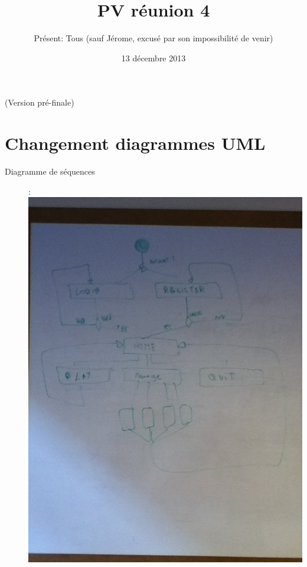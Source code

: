 \documentclass[a4paper,10pt]{article}
\author{Présent: Tous (sauf Jérome, excusé par son impossibilité de venir)}
\title{PV réunion 4}
\date{13 décembre 2013}
\begin{document}
\maketitle
\Large (Version pré-finale)
\part*{Changement diagrammes UML}
\begin{description}
\item[\Large Diagramme de séquences] :\\
\includegraphics[angle=-90, scale=0.5]{Sequence_Diagram.JPG}
\newpage


\end{description}
\end{document}
